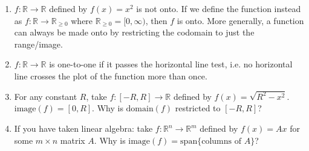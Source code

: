 \documentclass[11pt]{article}
\newcommand{\R}{\ensuremath{\mathbb R}}
\theoremstyle{plain}
\theoremstyle{definition}
\theoremstyle{remark}
\begin{document}
\begin{enumerate}
    \item $f: \R \rightarrow \R$ defined by $f(x) = x^2$ is not onto. If we define the function instead as $f: \R \rightarrow \R_{\geq 0}$ where $\R_{\geq 0} = [0, \infty)$, then $f$ is onto. More generally, a function can always be made onto by restricting the codomain to just the range/image.
    \item $f: \R \rightarrow \R$ is one-to-one if it passes the horizontal line test, i.e. no horizontal line crosses the plot of the function more than once.
    \item For any constant $R$, take $f: [-R,R] \rightarrow \R$ defined by $f(x) = \sqrt{R^2-x^2}$. $\text{image}(f) = [0,R]$. Why is $\text{domain}(f)$ restricted to $[-R,R]$?
    \item If you have taken linear algebra: take $f: \R^n \rightarrow \R^m$ defined by $f(x) = Ax$ for some $m \times n$ matrix $A$. Why is $\text{image}(f) = \text{span}\{\text{columns of $A$}\}$?
\end{enumerate}
\end{document}
